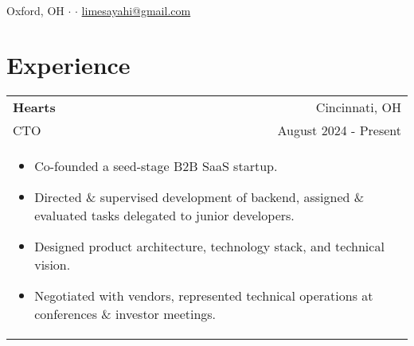 \documentclass[letterpaper,10pt]{article} %
\begin{document}
\singlespacing
\pagestyle{empty}
\par
{\\
\footnotesize{
Oxford, OH
$\cdot$
\href{tel:+1-513-484-0972}{\color{black}{+1 (513) 484-0972}}
$\cdot$
\href{mailto:limesayahi@gmail.com}{\color{black}limesayahi@gmail.com}\\
}}

\section{Experience}

\begin{tabular*}{\linewidth}{@{\extracolsep{\fill}} lr }

\textbf{Hearts} & \footnotesize{Cincinnati, OH}\\
\footnotesize{CTO} & \footnotesize{August 2024 - Present}\\
\multicolumn{2}{p{\linewidth}}{
    \scriptsize{\vspace{-3.25mm}\begin{itemize}[nosep]
        \item Co-founded a seed-stage B2B SaaS startup.
        \item Directed \& supervised development of backend, assigned \& evaluated tasks delegated to junior developers.
        \item Designed product architecture, technology stack, and technical vision.
        \item Negotiated with vendors, represented technical operations at conferences \& investor meetings.
    \end{itemize}}
}\\


\end{tabular*}
\end{document}
